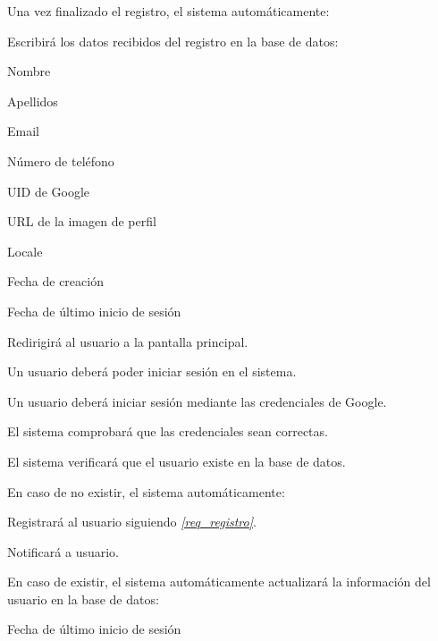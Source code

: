 \begin{RFGestionUsuarios}
\begin{RFGestionUsuarios}
   	\item Una vez finalizado el registro, el sistema automáticamente:
   		\begin{RFGestionUsuarios}
   		\item Escribirá los datos recibidos del registro en la base de datos:
    		\begin{RFGestionUsuarios}
      			\item Nombre
      			\item Apellidos
      			\item Email
      			\item Número de teléfono
      			\item UID de Google
      			\item URL de la imagen de perfil
      			\item Locale
      			\item Fecha de creación
      			\item Fecha de último inicio de sesión
    		\end{RFGestionUsuarios}
    		
    	\item Redirigirá al usuario a la pantalla principal.
    	\end{RFGestionUsuarios}
  \end{RFGestionUsuarios}
  
  \item Un usuario deberá poder iniciar sesión en el sistema. %
    \begin{RFGestionUsuarios}%
      \item Un usuario deberá iniciar sesión mediante las credenciales de Google.
      \begin{RFGestionUsuarios}%
      	\item El sistema comprobará que las credenciales sean correctas.
      	\item El sistema verificará que el usuario existe en la base de datos.
      		\begin{RFGestionUsuarios}%
      			\item En caso de no existir, el sistema automáticamente:
      			\begin{RFGestionUsuarios}%
      				\item Registrará al usuario siguiendo \textit{\ref{req_registro}}.
      				\item Notificará a usuario.
      			\end{RFGestionUsuarios}
      			\item En caso de existir, el sistema automáticamente actualizará la información del usuario en la base de datos:
      			\begin{RFGestionUsuarios}
      				\item Fecha de último inicio de sesión
      			\end{RFGestionUsuarios}
      		\end{RFGestionUsuarios}
      \end{RFGestionUsuarios}
      

\end{RFGestionUsuarios}
\end{RFGestionUsuarios}

